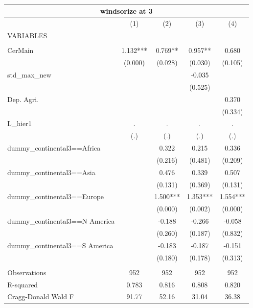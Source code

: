 \documentclass[12pt,a4paper]{article}
\begin{document}
\begin{tabular}{lcccc}
\multicolumn{5}{c}{windsorize at 3} \\ \hline
 & (1) & (2) & (3) & (4) \\
VARIABLES &  &  &  &  \\ \hline
 &  &  &  &  \\
CerMain & 1.132*** & 0.769** & 0.957** & 0.680 \\
 & (0.000) & (0.028) & (0.030) & (0.105) \\
std\_max\_new &  &  & -0.035 &  \\
 &  &  & (0.525) &  \\
Dep. Agri. &  &  &  & 0.370 \\
 &  &  &  & (0.334) \\
L\_hier1 & . & . & . & . \\
 & (.) & (.) & (.) & (.) \\
dummy\_continental3==Africa &  & 0.322 & 0.215 & 0.336 \\
 &  & (0.216) & (0.481) & (0.209) \\
dummy\_continental3==Asia &  & 0.476 & 0.339 & 0.507 \\
 &  & (0.131) & (0.369) & (0.131) \\
dummy\_continental3==Europe &  & 1.500*** & 1.353*** & 1.554*** \\
 &  & (0.000) & (0.002) & (0.000) \\
dummy\_continental3==N America &  & -0.188 & -0.266 & -0.058 \\
 &  & (0.260) & (0.187) & (0.832) \\
dummy\_continental3==S America &  & -0.183 & -0.187 & -0.151 \\
 &  & (0.180) & (0.178) & (0.313) \\
 &  &  &  &  \\
Observations & 952 & 952 & 952 & 952 \\
R-squared & 0.783 & 0.816 & 0.808 & 0.820 \\
 Cragg-Donald Wald F & 91.77 & 52.16 & 31.04 & 36.38 \\ \hline
\end{tabular}
\end{document}
